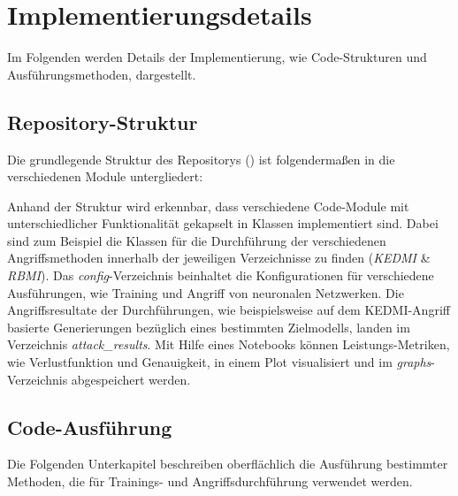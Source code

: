 \section{Implementierungsdetails} \label{chpt:Implementierung_Details}
Im Folgenden werden Details der Implementierung, wie Code-Strukturen und Ausführungsmethoden, dargestellt.
\subsection{Repository-Struktur}\label{repostruct}
Die grundlegende Struktur des Repositorys (\cite{weber_hosthansba_code_2024}) ist folgendermaßen in die verschiedenen Module untergliedert:

Anhand der Struktur wird erkennbar, dass verschiedene Code-Module mit unterschiedlicher Funktionalität gekapselt in Klassen implementiert sind. Dabei sind zum Beispiel die Klassen für die Durchführung der verschiedenen Angriffsmethoden innerhalb der jeweiligen Verzeichnisse zu finden (\textit{KEDMI} \& \textit{RBMI}). Das \textit{config}-Verzeichnis beinhaltet die Konfigurationen für verschiedene Ausführungen, wie Training und Angriff von neuronalen Netzwerken. Die Angriffsresultate der Durchführungen, wie beispielsweise auf dem KEDMI-Angriff basierte Generierungen bezüglich eines bestimmten Zielmodells, landen im Verzeichnis \textit{attack\_results}. Mit Hilfe eines Notebooks können Leistungs-Metriken, wie Verlustfunktion und Genauigkeit, in einem Plot visualisiert und im \textit{graphs}-Verzeichnis abgespeichert werden.


\subsection{Code-Ausführung}
Die Folgenden Unterkapitel beschreiben oberflächlich die Ausführung bestimmter Methoden, die für Trainings- und Angriffsdurchführung verwendet werden.

